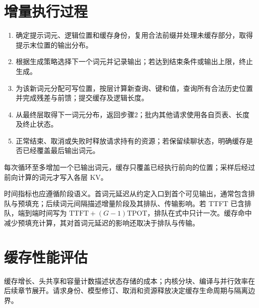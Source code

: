 \documentclass[../textbook.tex]{subfiles}
\begin{document}
\section{增量执行过程}

\begin{algorithm}[带缓存的自回归生成]
\begin{enumerate}
\item 确定提示词元、逻辑位置和缓存身份，复用合法前缀并处理未缓存部分，取得提示末位置的输出分布。
\item 根据生成策略选择下一个词元并记录输出；若达到结束条件或输出上限，终止生成。
\item 为该新词元分配可写位置，按层计算新查询、键和值，查询所有合法历史位置并完成残差与前馈；提交缓存及逻辑长度。
\item 从最终层取得下一词元分布，返回步骤2；批内其他请求使用各自页表、长度及终止状态。
\item 正常结束、取消或失败时释放请求持有的资源；若保留续聊状态，明确缓存是否已经覆盖最后输出词元。
\end{enumerate}
每次循环至多增加一个已输出词元，缓存只覆盖已经执行前向的位置；采样后经过前向计算的词元才写入各层 KV。
\end{algorithm}

时间指标也应遵循阶段语义。首词元延迟从约定入口到首个可见输出，通常包含排队与预填充；后续词元间隔描述增量阶段及其排队、传输影响。若 TTFT 已含排队，端到端时间写为 $\mathrm{TTFT}+(G-1)\mathrm{TPOT}$，排队在式中只计一次。缓存命中减少预填充计算，其对首词元延迟的影响还取决于排队与传输。

\section{缓存性能评估}

缓存增长、头共享和容量计数描述状态存储的成本；内核分块、编译与并行效率在后续章节展开。请求身份、模型修订、取消和资源释放决定缓存生命周期与隔离边界。




\chapterreferences
\myendchapterdocument
\end{document}
